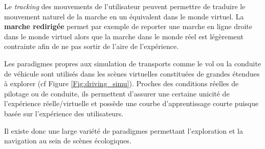 Le \textit{tracking} des mouvements de l'utilisateur peuvent permettre de traduire le mouvement naturel de la marche en un équivalent dans le monde virtuel. La \textbf{marche redirigée} permet par exemple de reporter une marche en ligne droite dans le monde virtuel alors que la marche dans le monde réel est légèrement contrainte afin de ne pas sortir de l'aire de l'expérience.

Les paradigmes propres aux simulation de transports comme le vol ou la conduite de véhicule sont utilisés dans les scènes virtuelles constituées de grandes étendues à explorer (cf Figure \ref{Fig:driving_simu}). Proches des conditions réelles de pilotage ou de conduite, ils permettent d'assurer une certaine unicité de l'expérience réelle/virtuelle et possède une courbe d'apprentissage courte puisque basée sur l'expérience des utilisateurs.

Il existe donc une large variété de paradigmes permettant l'exploration et la navigation au sein de scènes écologiques. 

